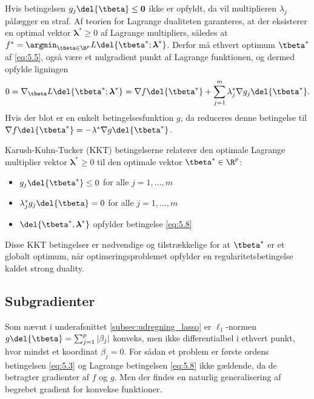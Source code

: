 Hvis betingelsen \(g_j \del{\tbeta} \leq \mathbf{0}\) ikke er opfyldt, da vil multiplieren \(\lambda_j\) pålægger en straf.
Af teorien for Lagrange dualiteten garanteres, at der eksisterer en optimal vektor \(\boldsymbol{\lambda}^* \geq 0\) af Lagrange multipliers, således at 
\(f^* = \argmin_{\tbeta \in \R^p} L \del{\tbeta^*; \boldsymbol{\lambda}^*}\).
Derfor må ethvert optimum \(\tbeta^*\) af \eqref{eq:5.5}, også være et nulgradient punkt af Lagrange funktionen, og dermed opfylde ligningen 
\begin{align}
0 = \nabla_{\tbeta} L \del{\tbeta^*; \boldsymbol{\lambda}^*} = \nabla f \del{\tbeta^*} + \sum_{j=1}^m \lambda_j^* \nabla g_j \del{\tbeta^*}. \label{eq:5.8}
\end{align}
Hvis der blot er en enkelt betingelsesfunktion \(g\), da reduceres denne betingelse til \(\nabla f \del{\tbeta^*} = - \lambda^* \nabla g \del{\tbeta^*}\).

Karush-Kuhn-Tucker (KKT) betingelserne relaterer den optimale Lagrange multiplier vektor \(\boldsymbol{\lambda}^* \geq 0\) til den optimale vektor \(\tbeta^* \in \R^p\):
\begin{itemize}
\item \(g_j \del{\tbeta^*} \leq 0\) for alle \(j = 1, \ldots, m\)
\item \(\lambda_j^* g_j \del{\tbeta} = 0\) for alle \(j = 1, \ldots, m\)
\item \(\del{\tbeta^*, \boldsymbol{\lambda}^*}\) opfylder betingelse \eqref{eq:5.8}
\end{itemize}
Disse KKT betingelser er nødvendige og tilstrækkelige for at \(\tbeta^*\) er et globalt optimum, når optimeringsproblemet opfylder en regularitetsbetingelse kaldet strong duality.
%
\subsection{Subgradienter}
Som nævnt i underafsnittet \ref{subsec:udregning_lasso} er \(\ell_1\)-normen \(g \del{\tbeta} = \sum_{j=1}^p \vert \beta_j \vert\) konveks, men ikke differentialbel i ethvert punkt, hvor mindst et koordinat \(\beta_j = 0\).
For sådan et problem er første ordens betingelsen \eqref{eq:5.3} og Lagrange betingelsen \eqref{eq:5.8} ikke gældende, da de betragter gradienter af \(f\) og \(g\).
Men der findes en naturlig generalisering af begrebet gradient for konvekse funktioner.

